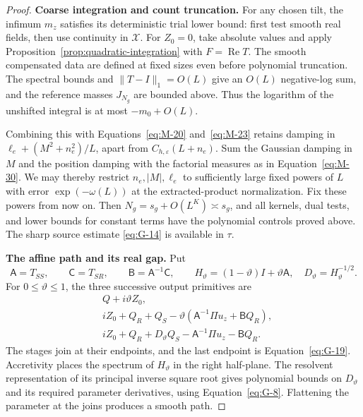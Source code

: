\begin{proof}
\par\smallskip\noindent\textbf{Coarse integration and count truncation.}
For any chosen tilt, the infimum $m_z$ satisfies its deterministic
trial lower bound: first test smooth real fields, then use continuity
in $\mathcal X$. For $Z_0=0$, take absolute values and apply
Proposition~\ref{prop:quadratic-integration} with
$F=\operatorname{Re}T$. The smooth compensated data are defined at
fixed sizes even before polynomial truncation. The spectral bounds
and $\|T-I\|_1=O(L)$ give an $O(L)$ negative-log sum, and the
reference masses $J_{N_g}$ are bounded above. Thus the logarithm of
the unshifted integral is at most $-m_0+O(L)$.

Combining this with Equations~\eqref{eq:M-20} and~\eqref{eq:M-23}
retains damping in
$\ell_e+(M^2+n_e^2)/L$, apart from $C_{h,\varepsilon}(L+n_e)$.
Sum the Gaussian damping in $M$ and the position damping with the
factorial measures as in Equation~\eqref{eq:M-30}. We may thereby
restrict $n_e,|M|,\ell_e$ to sufficiently large fixed powers of $L$
with error $\exp(-\omega(L))$ at the extracted-product normalization.
Fix these powers from now on. Then $N_g=s_g+O(L^K)\asymp s_g$,
and all kernels, dual tests, and lower bounds for constant terms have
the polynomial controls proved above. The sharp source estimate
\eqref{eq:G-14} is available in $\tau$.

\par\smallskip\noindent\textbf{The affine path and its real gap.}
Put
\[
 \mathsf A=T_{SS},\qquad \mathsf C=T_{SR},\qquad
 \mathsf B=\mathsf A^{-1}\mathsf C,
 \qquad H_\vartheta=(1-\vartheta)I+\vartheta\mathsf A,
 \quad D_\vartheta=H_\vartheta^{-1/2}.
\]
For $0\le\vartheta\le1$, the three successive output primitives are
\[
\begin{aligned}
 &Q+i\vartheta Z_0,\\
 &iZ_0+Q_R+Q_S
       -\vartheta(\mathsf A^{-1}\Pi u_z+\mathsf BQ_R),\\
 &iZ_0+Q_R+D_\vartheta Q_S
       -\mathsf A^{-1}\Pi u_z-\mathsf BQ_R.
\end{aligned}
\]
The stages join at their endpoints, and the last endpoint is
Equation~\eqref{eq:G-19}. Accretivity places the spectrum of
$H_\vartheta$ in the right half-plane. The resolvent representation
of its principal inverse square root gives polynomial bounds on
$D_\vartheta$ and its required parameter derivatives, using
Equation~\eqref{eq:G-8}. Flattening the parameter at the joins
produces a smooth path.


\end{proof}
